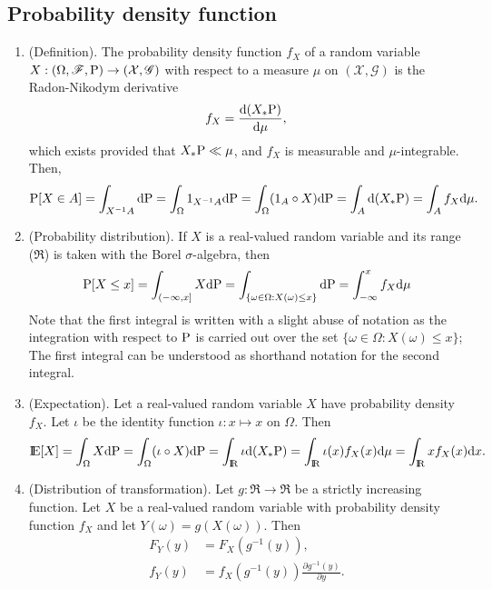\documentclass[a4paper,10pt]{article}
\begin{document}
\subsection{Probability density function}
\begin{enumerate}
 \item (Definition).
    The probability density function $f_X$ of a random variable $X:(\Omega,\mathscr{F},\mathrm{P})\to (\mathcal{X},\mathscr{G})$
    with respect to a measure $\mu$ on $(\mathcal{X},\mathscr{G})$ is the Radon-Nikodym derivative
    \[
     f_X = \frac{\mathrm{d} (X_*\mathrm{P})}{\mathrm{d} \mu},
    \]
    which exists provided that $X_*\mathrm{P} \ll \mu$, and $f_X$ is measurable and $\mu$-integrable. Then,
    \begin{align*}
     \mathrm{P}[X\in A] = \int_{X^{-1}A}\mathrm{d} \mathrm{P}
                   = \int_{\Omega} 1_{X^{-1}A}\mathrm{d}\mathrm{P}
                   = \int_{\Omega} (1_{A}\circ X)\mathrm{d}\mathrm{P}
                   = \int_{A}\mathrm{d}(X_*\mathrm{P})
                   = \int_A f_X \mathrm{d} \mu.
    \end{align*}
  \item (Probability distribution).
	If $X$ is a real-valued random variable and its range ($\Re$) is taken with the 
        Borel $\sigma$-algebra, then 
        \begin{align*}
         \mathrm{P}[X\leq x] = \int_{(-\infty, x]}X\mathrm{d} \mathrm{P}
         = \int_{\{\omega\in\Omega: X(\omega) \leq x\}}\mathrm{d} \mathrm{P}
         = \int_{-\infty}^x f_X\mathrm{d} \mu
        \end{align*}
        Note that the first integral is written with a slight abuse of notation as the 
        integration with respect to $\mathrm{P}$ is carried out over the set $\{\omega\in\Omega: X(\omega) \leq x\}$;
        The first integral can be understood as shorthand notation for the second integral.
  \item (Expectation).
	Let a real-valued random variable $X$ have probability density $f_X$. Let $\iota$
	be the identity function $\iota:x\mapsto x$ on $\Omega$. Then
        \[
         \E[X] = \int_\Omega X\d\prob 
               = \int_\Omega (\iota\circ X)\d\prob 
               = \int_\Re \iota\d(X_*\prob)
               = \int_\Re \iota(x) f_X(x) \d\mu
               = \int_\Re x f_X(x) \d x.
        \]
  \item (Distribution of transformation). Let $g:\Re\to\Re$ be a strictly increasing function. Let $X$ be a real-valued random variable with probability density function $f_X$ and let $Y(\omega) = g(X(\omega))$. Then
  \begin{align*}
   F_Y(y) &= F_X(g^{-1}(y)),\\
   f_Y(y) &= f_X(g^{-1}(y))\frac{\partial g^{-1}(y)}{\partial y}.
  \end{align*}

\end{enumerate}
\end{document}
